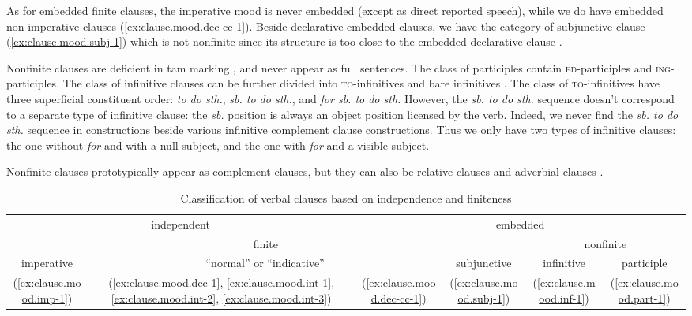 \documentclass[UTF8, a4paper, oneside, scheme=plain, 12pt]{ctexbook}
\newcommand*{\citesec}[1]{\S~{#1}}
\newcommand*{\citechap}[1]{Ch.~{#1}}
\newcommand*{\citepage}[1]{p.~{#1}}
\newcommand{\form}[1]{\emph{#1}}
\newcommand{\formcat}[1]{\textsc{#1}}
\begin{document}
As for embedded finite clauses,
the imperative mood is never embedded (except as direct reported speech),
while we do have embedded non-imperative clauses (\ref{ex:clause.mood.dec-cc-1}).
Beside declarative embedded clauses,
we have the category of subjunctive clause (\ref{ex:clause.mood.subj-1})
which is not nonfinite 
since its structure is too close to 
the embedded declarative clause \citep[\citepage{83}]{cgel}. 

Nonfinite clauses are deficient in \acs{tam} marking 
\citep[\citepage{1174}, {[5-7]}]{cgel},
and never appear as full sentences.
The class of participles contain \formcat{ed}-participles and \formcat{ing}-participles.
The class of infinitive clauses can be further divided into 
\formcat{to}-infinitives and bare infinitives \citet[\citechap{14}, \citesec{1.4.3}]{cgel}.
The class of \formcat{to}-infinitives have three superficial constituent order:
\form{to do sth.}, \form{sb. to do sth.}, and \form{for sb. to do sth.}
However, the \form{sb. to do sth.} sequence doesn't correspond to a separate type of infinitive clause:
the \form{sb.} position is always an object position licensed by the verb.
Indeed, we never find the \form{sb. to do sth.} sequence
in constructions beside various infinitive complement clause constructions.
Thus we only have two types of infinitive clauses:
the one without \form{for} and with a null subject,
and the one with \form{for} and a visible subject.

Nonfinite clauses prototypically appear as complement clauses, 
but they can also be relative clauses and adverbial clauses \citep[\citepage{1264}]{cgel}.

\begin{table}[H]
    \caption{Classification of verbal clauses based on independence and finiteness}
    \label{tbl:verbal-clause}
    \centering
    \begin{tabular}{@{}cccccc@{}}
        \toprule
        \multicolumn{2}{c}{independent}            & \multicolumn{4}{c}{ embedded}                                                                \\ \cmidrule(lr){1-2} \cmidrule(lr){3-6}
        \multicolumn{4}{c}{finite}                                                                & \multicolumn{2}{c}{nonfinite}                         \\ \cmidrule(lr){1-4} \cmidrule(lr){5-6}
        imperative               & \multicolumn{2}{c}{``normal'' or ``indicative''} & subjunctive & infinitive           & participle \\ \midrule
        (\ref{ex:clause.mood.imp-1})    &  
        (\ref{ex:clause.mood.dec-1}, \ref{ex:clause.mood.int-1}, \ref{ex:clause.mood.int-2}, \ref{ex:clause.mood.int-3})                 &   
        (\ref{ex:clause.mood.dec-cc-1})         &           
        (\ref{ex:clause.mood.subj-1})                & 
        (\ref{ex:clause.mood.inf-1})  &        
        (\ref{ex:clause.mood.part-1})                       \\ \bottomrule
    \end{tabular}
\end{table}
\end{document}
